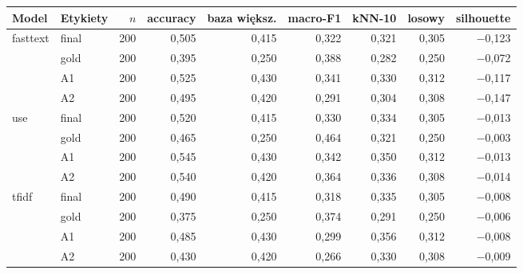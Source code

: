 \begin{tabular}{llrrrrrrr}
\toprule
Model & Etykiety & $n$ & accuracy & baza większ. & macro-F1 & kNN-10 & losowy & silhouette \\
\midrule
fasttext & final & 200 & 0{,}505 & 0{,}415 & 0{,}322 & 0{,}321 & 0{,}305 & $-$0{,}123 \\
 & gold & 200 & 0{,}395 & 0{,}250 & 0{,}388 & 0{,}282 & 0{,}250 & $-$0{,}072 \\
 & A1 & 200 & 0{,}525 & 0{,}430 & 0{,}341 & 0{,}330 & 0{,}312 & $-$0{,}117 \\
 & A2 & 200 & 0{,}495 & 0{,}420 & 0{,}291 & 0{,}304 & 0{,}308 & $-$0{,}147 \\
\midrule
use & final & 200 & 0{,}520 & 0{,}415 & 0{,}330 & 0{,}334 & 0{,}305 & $-$0{,}013 \\
 & gold & 200 & 0{,}465 & 0{,}250 & 0{,}464 & 0{,}321 & 0{,}250 & $-$0{,}003 \\
 & A1 & 200 & 0{,}545 & 0{,}430 & 0{,}342 & 0{,}350 & 0{,}312 & $-$0{,}013 \\
 & A2 & 200 & 0{,}540 & 0{,}420 & 0{,}364 & 0{,}336 & 0{,}308 & $-$0{,}014 \\
\midrule
tfidf & final & 200 & 0{,}490 & 0{,}415 & 0{,}318 & 0{,}335 & 0{,}305 & $-$0{,}008 \\
 & gold & 200 & 0{,}375 & 0{,}250 & 0{,}374 & 0{,}291 & 0{,}250 & $-$0{,}006 \\
 & A1 & 200 & 0{,}485 & 0{,}430 & 0{,}299 & 0{,}356 & 0{,}312 & $-$0{,}008 \\
 & A2 & 200 & 0{,}430 & 0{,}420 & 0{,}266 & 0{,}330 & 0{,}308 & $-$0{,}009 \\
\bottomrule
\end{tabular}
